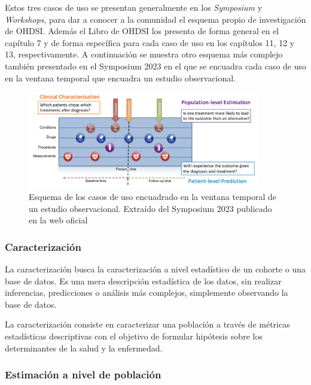 Estos tres casos de uso se presentan generalmente en los \textit{Symposium} y \textit{Workshops}, para dar a conocer a la comunidad el esquema propio de investigación de OHDSI. Además el Libro de OHDSI \cite{OHDSIbook} los presenta de forma general en el capítulo 7 y de forma específica para cada caso de uso en los capítulos 11, 12 y 13, respectivamente. A continuación se muestra otro esquema más complejo también presentado en el Symposium 2023 en el que se encuadra cada caso de uso en la ventana temporal que encuadra un estudio observacional.

\begin{figure}[H]
\centering
\includegraphics[width=0.90\textwidth]{figures/useCasesJourney.png}
     \caption{Esquema de los casos de uso encuadrado en la ventana temporal de un estudio observacional. Extraído del Symposium 2023 publicado en la web oficial \cite{OHDSIwebsite}}
    \label{fig:useCasesJourney}
\end{figure}


\subsubsection{Caracterización}

La caracterización busca la caracterización a nivel estadístico de un cohorte o una base de datos. Es una mera descripción estadística de los datos, sin realizar inferencias, predicciones o análisis más complejos, simplemente observando la base de datos.

La caracterización consiste en caracterizar una población a través de métricas estadísticas descriptivas con el objetivo de formular hipótesis sobre los determinantes de la salud y la enfermedad.

\subsubsection{Estimación a nivel de población}

